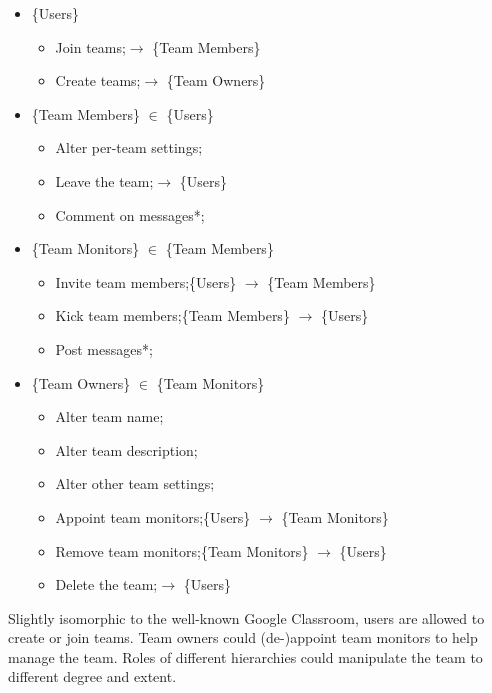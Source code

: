 \documentclass[12pt]{report}
\begin{document}
\begin{itemize}
	\item \{Users\}
	      \begin{itemize}
		      \item Join teams;\null\hfill $\rightarrow$ \{Team Members\}
		      \item Create teams;\null\hfill $\rightarrow$ \{Team Owners\}
	      \end{itemize}
	\item \{Team Members\} $\in$ \{Users\}
	      \begin{itemize}
		      \item Alter per-team settings;
		      \item Leave the team;\null\hfill $\rightarrow$ \{Users\}
		      \item Comment on messages*;
	      \end{itemize}
	\item \{Team Monitors\} $\in$ \{Team Members\}
	      \begin{itemize}
		      \item Invite team members;\null\hfill \{Users\} $\rightarrow$ \{Team Members\}
		      \item Kick team members;\null\hfill \{Team Members\} $\rightarrow$ \{Users\}
		      \item Post messages*;
	      \end{itemize}
	\item \{Team Owners\} $\in$ \{Team Monitors\}
	      \begin{itemize}
		      \item Alter team name;
		      \item Alter team description;
		      \item Alter other team settings;
		      \item Appoint team monitors;\null\hfill \{Users\} $\rightarrow$ \{Team Monitors\}
		      \item Remove team monitors;\null\hfill \{Team Monitors\} $\rightarrow$ \{Users\}
		      \item Delete the team;\null\hfill $\rightarrow$ \{Users\}
	      \end{itemize}
\end{itemize}

Slightly isomorphic to the well-known Google Classroom,
users are allowed to create or join teams.
Team owners could (de-)appoint team monitors to help manage the team.
Roles of different hierarchies could manipulate the team to different degree and extent.
\vspace{1 em}
\end{document}
